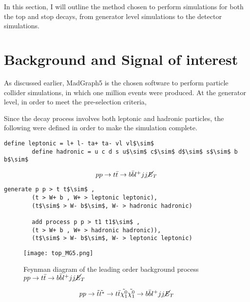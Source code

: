 In this section, I will outline the method chosen to perform simulations for both the top and stop decays, from generator level simulations to the detector simulations. 

\section{Background and Signal of interest}

As discussed earlier, MadGraph5 is the chosen software to perform particle collider simulations, in which one million events were produced. At the generator level, in order to meet the pre-selection criteria, 

Since the decay process involves both leptonic and hadronic particles, the following were defined in order to make the simulation complete.

\begin{lstlisting}[mathescape = true]
        define leptonic = l+ l- ta+ ta- vl vl$\sim$
        define hadronic = u c d s u$\sim$ c$\sim$ d$\sim$ s$\sim$ b b$\sim$
\end{lstlisting}


\begin{equation}
 pp \rightarrow t \Bar{t} \rightarrow b\Bar{b}l^{+}jj\cancel{\it{E}}_{T}
 \label{eq:background}
\end{equation}


\begin{lstlisting}[mathescape = true]
        generate p p > t t$\sim$ , 
        (t > W+ b , W+ > leptonic leptonic),
        (t$\sim$ > W- b$\sim$, W- > hadronic hadronic)
        
        add process p p > t1 t1$\sim$ , 
        (t > W+ b , W+ > hadronic hadronic)), 
        (t$\sim$ > W- b$\sim$, W- > leptonic leptonic)
\end{lstlisting}


\begin{figure}[htbp]
    \centering
    \texttt{[image: top\_MG5.png]}
    \caption{Feynman diagram of the leading order background process $pp \rightarrow t \Bar{t} \rightarrow b\Bar{b}l^{+}jj\cancel{\it{E}}_{T} $}
    \label{fig:bkrdFeyn}
\end{figure}



\begin{equation}
  pp \rightarrow \Tilde{t}\Tilde{t^*} \rightarrow t \Bar{t} \Tilde{\chi^0_1}\Tilde{\chi^0_1} \rightarrow b\Bar{b}l^{+}jj\cancel{\it{E}}_{T}
  \label{eq:signal}
\end{equation}


